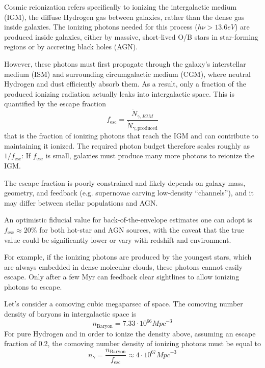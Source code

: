 Cosmic reionization refers specifically to ionizing the intergalactic medium (IGM), the diffuse Hydrogen gas between galaxies, rather than the dense gas inside galaxies. The ionizing photons needed for this process ($h\nu > 13.6\unit{eV}$) are produced inside galaxies, either by massive, short-lived O/B stars in star-forming regions or by accreting black holes (AGN).
\par However, these photons must first propagate through the galaxy’s interstellar medium (ISM) and surrounding circumgalactic medium (CGM), where neutral Hydrogen and dust efficiently absorb them. As a result, only a fraction of the produced ionizing radiation actually leaks into intergalactic space. This is quantified by the escape fraction
\begin{equation*}
    f_{\text{esc}} = \frac{\dot{N}_{\gamma, IGM}}{\dot{N}_{\gamma,\text{produced}}}
\end{equation*}
that is the fraction of ionizing photons that reach the IGM and can contribute to maintaining it ionized. The required photon budget therefore scales roughly as $1/f_{\text{esc}}$: If $f_{\text{esc}}$ is small, galaxies must produce many more photons to reionize the IGM.
\par The escape fraction is poorly constrained and likely depends on galaxy mass, geometry, and feedback (e.g. supernovae carving low-density “channels”), and it may differ between stellar populations and AGN. 
\par An optimistic fiducial value for back-of-the-envelope estimates one can adopt is $f_{\text{esc}}\approx 20\%$ for both hot-star and AGN sources, with the caveat that the true value could be significantly lower or vary with redshift and environment.
\par For example, if the ionizing photons are produced by the youngest stars, which are always embedded in dense molecular clouds, these photons cannot easily escape. Only after a few Myr can feedback clear sightlines to allow ionizing photons to escape.
\par Let’s consider a comoving cubic megaparsec of space. The comoving number density of baryons in intergalactic space is
\begin{equation*}
    n_{\text{Baryon}} = 7.33\cdot 10^{66}\unit{Mpc}^{-3}
\end{equation*}
For pure Hydrogen and in order to ionize the density above, assuming an escape fraction of 0.2, the comoving number density of ionizing photons must be equal to
\begin{equation*}
    n_{\gamma} = \frac{n_{\text{Baryon}}}{f_{\text{esc}}} \approx 4\cdot 10^{67}\unit{Mpc}^{-3}
\end{equation*}
